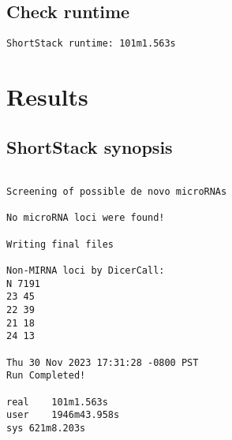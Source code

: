 \documentclass[
]{article}
\newenvironment{Shaded}{\begin{snugshade}}{\end{snugshade}}
\newcommand{\AttributeTok}[1]{\textcolor[rgb]{0.77,0.63,0.00}{#1}}
\newcommand{\BuiltInTok}[1]{#1}
\newcommand{\CommentTok}[1]{\textcolor[rgb]{0.56,0.35,0.01}{\textit{#1}}}
\newcommand{\DataTypeTok}[1]{\textcolor[rgb]{0.13,0.29,0.53}{#1}}
\newcommand{\FunctionTok}[1]{\textcolor[rgb]{0.00,0.00,0.00}{#1}}
\newcommand{\KeywordTok}[1]{\textcolor[rgb]{0.13,0.29,0.53}{\textbf{#1}}}
\newcommand{\NormalTok}[1]{#1}
\newcommand{\StringTok}[1]{\textcolor[rgb]{0.31,0.60,0.02}{#1}}
\newcommand{\VariableTok}[1]{\textcolor[rgb]{0.00,0.00,0.00}{#1}}
\begin{document}
\hypertarget{check-runtime}{%
\subsection{Check runtime}\label{check-runtime}}

\begin{Shaded}
\end{Shaded}

\begin{verbatim}
ShortStack runtime: 101m1.563s
\end{verbatim}

\hypertarget{results}{%
\section{Results}\label{results}}

\hypertarget{shortstack-synopsis}{%
\subsection{ShortStack synopsis}\label{shortstack-synopsis}}

\begin{Shaded}
\end{Shaded}

\begin{verbatim}

Screening of possible de novo microRNAs

No microRNA loci were found!

Writing final files

Non-MIRNA loci by DicerCall:
N 7191
23 45
22 39
21 18
24 13

Thu 30 Nov 2023 17:31:28 -0800 PST
Run Completed!

real    101m1.563s
user    1946m43.958s
sys 621m8.203s
\end{verbatim}
\end{document}
